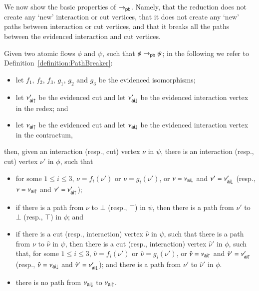 
We now show the basic properties of $\to_{\mathsf{pb}}$. Namely, that the reduction does not create any `new' interaction or cut vertices, that it does not create any `new' paths between interaction or cut vertices, and that it breaks all the paths between the evidenced interaction and cut vertices.

\begin{lemma}\label{lemma:PathBreaker}
Given two atomic flows $\phi$ and $\psi$, such that $\phi\to_{\mathsf{pb}}\psi$; in the following we refer to Definition~\ref{definition:PathBreaker}:
\begin{itemize}
\item let $f_1$, $f_2$, $f_3$, $g_1$, $g_2$ and $g_3$ be the evidenced isomorphisms;
\item let $\nu'_{{\mathsf{ai}}{\uparrow}}$ be the evidenced cut and let $\nu'_{{\mathsf{ai}}{\downarrow}}$ be the evidenced interaction vertex in the redex; and
\item let $\nu_{{\mathsf{ai}}{\uparrow}}$ be the evidenced cut and let $\nu_{{\mathsf{ai}}{\downarrow}}$ be the evidenced interaction vertex in the contractum,
\end{itemize}
then, given an interaction (resp., cut) vertex $\nu$ in $\psi$, there is an interaction (resp., cut) vertex $\nu'$ in $\phi$, such that
\begin{itemize}
\item for some $1\le i\le 3$, $\nu=f_i(\nu')$ or $\nu=g_i(\nu')$, or $\nu=\nu_{{\mathsf{ai}}{\downarrow}}$ and $\nu'=\nu'_{{\mathsf{ai}}{\downarrow}}$ (resp., $\nu=\nu_{{\mathsf{ai}}{\uparrow}}$ and $\nu'=\nu'_{{\mathsf{ai}}{\uparrow}}$);
\item if there is a path from $\nu$ to $\bot$ (resp., $\top$) in $\psi$, then there is a path from $\nu'$ to $\bot$ (resp., $\top$) in $\phi$; and
\item if there is a cut (resp., interaction) vertex $\hat\nu$ in $\psi$, such that there is a path from $\nu$ to $\hat\nu$ in $\psi$, then there is a cut (resp., interaction) vertex $\hat\nu'$ in $\phi$, such that, for some $1\le i\le 3$, $\hat\nu=f_i(\nu')$ or $\hat\nu=g_i(\nu')$, or $\hat\nu=\nu_{{\mathsf{ai}}{\uparrow}}$ and $\hat\nu'=\nu'_{{\mathsf{ai}}{\uparrow}}$ (resp., $\hat\nu=\nu_{{\mathsf{ai}}{\downarrow}}$ and $\hat\nu'=\nu'_{{\mathsf{ai}}{\downarrow}}$); and there is a path from $\nu'$ to $\hat\nu'$ in $\phi$.
\item there is no path from $\nu_{{\mathsf{ai}}{\downarrow}}$ to $\nu_{{\mathsf{ai}}{\uparrow}}$.
\end{itemize}
\end{lemma}


